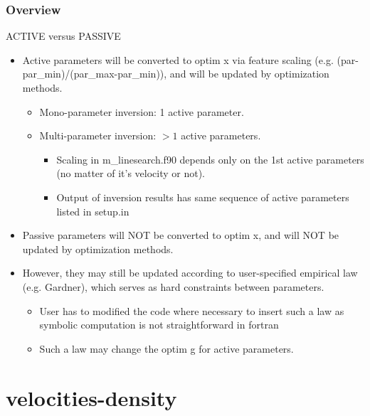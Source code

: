 \documentclass[9pt]{beamer}
\begin{document}
\begin{frame}\frametitle{Overview}
  
  \begin{block}{ACTIVE versus PASSIVE}
  \begin{itemize}
    \item Active parameters will be converted to optim x via feature scaling (e.g. (par-par\_min)/(par\_max-par\_min)),
          and will be updated by optimization methods.
    \begin{itemize}
      \item Mono-parameter inversion: 1 active parameter.
      \item Multi-parameter inversion: $>1$ active parameters.
      \begin{itemize}
         \item Scaling in m\_linesearch.f90 depends only on the 1st active parameters (no matter of it's velocity or not).
         \item Output of inversion results has same sequence of active parameters listed in setup.in
      \end{itemize}
    \end{itemize}

    \item Passive parameters will NOT be converted to optim x, and will NOT be updated by optimization methods.
    \item However, they may still be updated according to user-specified empirical law (e.g. Gardner), which serves as hard constraints between parameters.
      \begin{itemize}
        \item User has to modified the code where necessary to insert such a law as symbolic computation is not straightforward in fortran
        \item Such a law may change the optim g for active parameters.
      \end{itemize}
      
  \end{itemize}
  \end{block}    

\end{frame}

\section{velocities-density}
\end{document}
